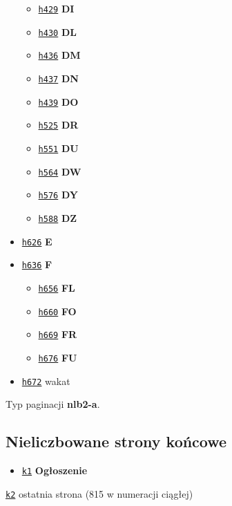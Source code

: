 \documentclass[12]{mwart}
\begin{document}
\begin{itemize}
\begin{itemize}
  \item \href{\pai{1}{561}}{\texttt{h429}} \textbf{DI}
  \item \href{\pai{1}{562}}{\texttt{h430}} \textbf{DL}
  \item \href{\pai{1}{568}}{\texttt{h436}} \textbf{DM}
  \item \href{\pai{1}{569}}{\texttt{h437}} \textbf{DN}
  \item \href{\pai{1}{571}}{\texttt{h439}} \textbf{DO}
  \item \href{\pai{1}{657}}{\texttt{h525}} \textbf{DR}
  \item \href{\pai{1}{683}}{\texttt{h551}} \textbf{DU}
  \item \href{\pai{1}{696}}{\texttt{h564}} \textbf{DW}
  \item \href{\pai{1}{708}}{\texttt{h576}} \textbf{DY}
  \item \href{\pai{1}{720}}{\texttt{h588}} \textbf{DZ}
  \end{itemize}
\item \href{\pai{1}{758}}{\texttt{h626}} \textbf{E}
\item \href{\pai{1}{768}}{\texttt{h636}} \textbf{F}
  \begin{itemize}
  \item \href{\pai{1}{788}}{\texttt{h656}} \textbf{FL}
  \item \href{\pai{1}{792}}{\texttt{h660}} \textbf{FO}
  \item \href{\pai{1}{801}}{\texttt{h669}} \textbf{FR}
  \item \href{\pai{1}{808}}{\texttt{h676}} \textbf{FU}
  \end{itemize}
  \item \href{\pai{1}{814}}{\texttt{h672}} wakat
\end{itemize}


Typ paginacji \textbf{nlb2-a}.

\subsection{Nieliczbowane strony końcowe}
\label{sec:niel-strony-kocowe}


\begin{itemize}
\item \href{\pai{1}{815}}{\texttt{k1}} \textbf{Ogłoszenie}
\end{itemize}

\href{\pai{1}{815}}{\texttt{k2}} ostatnia strona (815 w numeracji ciągłej)
\end{document}
